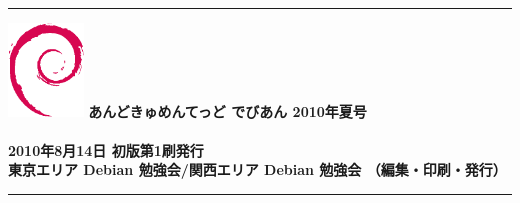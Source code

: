 \documentclass[mingoth,a4paper]{jsarticle}
\begin{document}
\vspace*{15cm}
{\color{dancerlightblue}\rule{\hsize}{1mm}}
\vspace{2mm}
\includegraphics[width=2cm]{image200502/openlogo-nd.eps}
\noindent \Large \bf あんどきゅめんてっど でびあん 2010年夏号\\ \\
\noindent \normalfont 2010年8月14日 \hspace{5mm}  初版第1刷発行\\
\noindent \normalfont 東京エリア Debian 勉強会/関西エリア Debian 勉強会 （編集・印刷・発行）\\
{\color{dancerdarkblue}\rule{\hsize}{1mm}}
\end{document}
